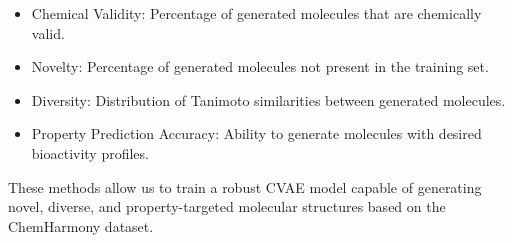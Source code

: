 \begin{itemize}
    \item Chemical Validity: Percentage of generated molecules that are chemically valid.
    \item Novelty: Percentage of generated molecules not present in the training set.
    \item Diversity: Distribution of Tanimoto similarities between generated molecules.
    \item Property Prediction Accuracy: Ability to generate molecules with desired bioactivity profiles.
\end{itemize}

These methods allow us to train a robust CVAE model capable of generating novel, diverse, and property-targeted molecular structures based on the ChemHarmony dataset.
